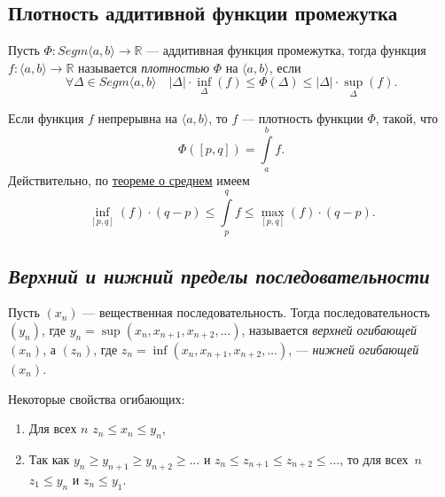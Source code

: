 \subsection{Плотность аддитивной функции промежутка}

\begin{definition}
	Пусть \(\Phi \colon Segm \langle a, b \rangle \to \mathbb{R}\) --- аддитивная функция промежутка, тогда функция \(f: \langle a, b \rangle \to \mathbb{R}\) называется \textit{плотностью} \(\Phi\) на \(\langle a, b \rangle\), если \[
	\forall \Delta \in Segm \langle a, b \rangle \quad |\Delta| \cdot \inf_\Delta(f) \leqslant \Phi(\Delta) \leqslant |\Delta| \cdot \sup_\Delta(f).
	\]
\end{definition}

\begin{example}
	Если функция \(f\) непрерывна на \(\langle a, b \rangle\), то \(f\) --- плотность функции \(\Phi\), такой, что \[
	\Phi([p, q]) = \int\limits_a^b f.
	\]
	Действительно, по \hyperlink{sredneye}{теореме о среднем} имеем\[
	\inf_{[p, q]} (f) \cdot (q - p) \leqslant \int\limits_p^q f \leqslant \max_{[p, q]} (f) \cdot (q - p).
	\]
\end{example}

\subsection{\itshape Верхний и нижний пределы последовательности}

\begin{ndefinition}
	Пусть \((x_n)\) --- вещественная последовательность. Тогда последовательность \((y_n)\), где \(y_n = \sup (x_n, x_{n + 1}, x_{n + 2}, \ldots)\), называется \textit{верхней огибающей} \((x_n)\), а \((z_n)\), где \(z_n = \inf (x_n, x_{n + 1}, x_{n + 2}, \ldots)\), --- \textit{нижней огибающей} \((x_n)\).
\end{ndefinition}

\begin{remark}
	Некоторые свойства огибающих:
	\begin{enumerate}
		\item Для всех \(n\) \(z_n \leqslant x_n \leqslant y_n\),
		\item Так как \(y_n \geqslant y_{n + 1} \geqslant y_{n + 2} \geqslant \ldots\) и \(z_n \leqslant z_{n + 1} \leqslant z_{n + 2} \leqslant \ldots\), то для всех~\(n\) \(z_1 \leqslant y_n\) и \(z_n \leqslant y_1\).
	\end{enumerate}
\end{remark}

